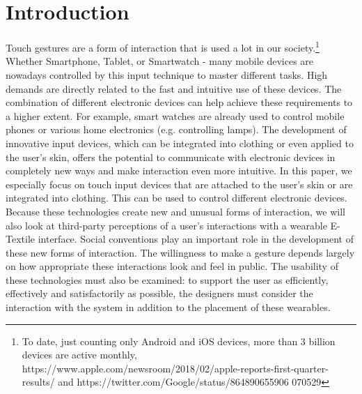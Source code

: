 \documentclass{sigchi}
\begin{document}
\section{Introduction}
%

Touch gestures are a form of interaction that is used a lot in our society.\footnote{To date, just counting only Android and iOS devices, more than 3 billion devices are active monthly, https://www.apple.com/newsroom/2018/02/apple-reports-first-quarter-results/ and https://twitter.com/Google/status/864890655906
070529} Whether Smartphone, Tablet, or Smartwatch - many mobile devices are nowadays controlled by this input technique to master different tasks. High demands are directly related to the fast and intuitive use of these devices. The combination of different electronic devices can help achieve these requirements to a higher extent. For example, smart watches are already used to control mobile phones or various home electronics (e.g. controlling lamps). The development of innovative input devices, which can be integrated into clothing or even applied to the user's skin, offers the potential to communicate with electronic devices in completely new ways and make interaction even more intuitive. In this paper, we especially focus on touch input devices that are attached to the user's skin or are integrated into clothing. This can be used to control different electronic devices.
Because these technologies create new and unusual forms of interaction, we will also look at third-party perceptions of a user’s interactions with a wearable E-Textile interface. Social conventions play an important role in the development of these new forms of interaction. The willingness to make a gesture depends largely on how appropriate these interactions look and feel in public. \cite{touch-wrist} The usability of these technologies must also be examined: to support the user as efficiently, effectively and satisfactorily as possible, the designers must consider the interaction with the system in addition to the placement of these wearables.

\end{document}
